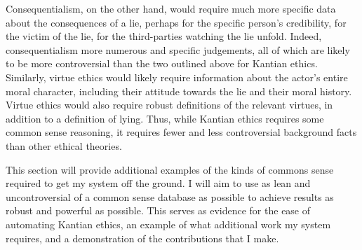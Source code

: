 \begin{isabellebody}
\begin{isamarkuptext}
Consequentialism, on the other hand, would require much more specific data about the consequences of 
a lie, perhaps for the specific person's credibility, for the victim of the lie, for the third-parties 
watching the lie unfold. Indeed, consequentialism more numerous and specific judgements, all of which are 
likely to be more controversial than the two outlined above for Kantian ethics. Similarly, virtue ethics
would likely require information about the actor's entire moral character, including their attitude
towards the lie and their moral history. Virtue ethics would also require robust definitions of the 
relevant virtues, in addition to a definition of lying. Thus, while Kantian ethics requires some 
common sense reasoning, it requires fewer and less controversial background facts than other ethical theories.

This section will provide additional examples of the kinds of commons sense required to get my system
off the ground. I will aim to use as lean and uncontroversial of a common sense database as possible
to achieve results as robust and powerful as possible. This serves as evidence for the ease of automating
Kantian ethics, an example of what additional work my system requires, and a demonstration of the contributions
that I make.%
\end{isamarkuptext}\isamarkuptrue%
%
\isadelimdocument
%
\endisadelimdocument
%
\isatagdocument
%
\endisatagdocument
{\isafolddocument}%
%
\isadelimdocument
%
\endisadelimdocument
%
\isadelimtheory
%
\endisadelimtheory
%
\isatagtheory
%
\endisatagtheory
{\isafoldtheory}%
%
\isadelimtheory
%
\endisadelimtheory
%
\end{isabellebody}%
\endinput
